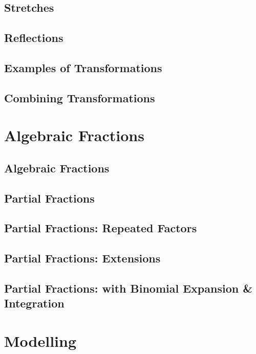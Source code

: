 \documentclass[../maths.tex]{subfiles}
\begin{document}
\subsection*{Stretches}
\subsection*{Reflections}
\subsection*{Examples of Transformations}
\subsection*{Combining Transformations}
\section{Algebraic Fractions}
\subsection*{Algebraic Fractions}
\subsection*{Partial Fractions}
\subsection*{Partial Fractions: Repeated Factors}
\subsection*{Partial Fractions: Extensions}
\subsection*{Partial Fractions: with Binomial Expansion \& Integration}
\section{Modelling}
\end{document}
